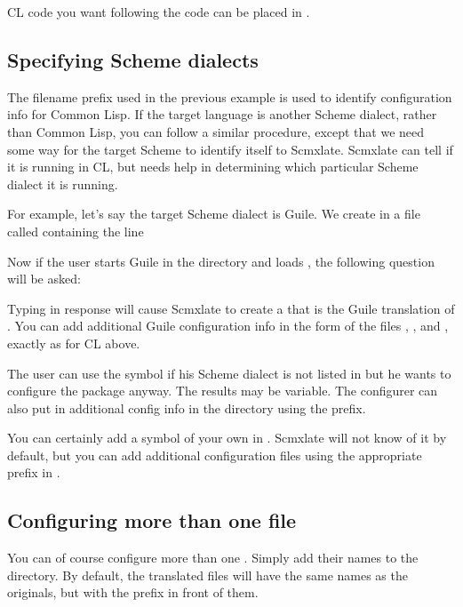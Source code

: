 CL code you want following the  code can be
placed in .

\subsection{Specifying Scheme dialects}

The filename prefix  used in the previous
example is used to identify configuration info
for Common Lisp.  If the target language is another
Scheme dialect, rather than Common Lisp, you can follow
a similar procedure, except that we need some way for
the target Scheme to identify itself to Scmxlate.
Scmxlate can tell if it is running in CL, but
needs help in determining which particular Scheme
dialect it is running.

For example, let's say the target Scheme dialect
is Guile.  We create in  a file called
 containing the line


Now if the user starts Guile in the 
directory and loads , the following
question will be asked:


Typing  in response will cause Scmxlate to
create a  that is the Guile translation
of .  You can add additional Guile
configuration info in the form of the files
, ,
and , exactly as for CL
above.

The user can use the symbol  if his Scheme
dialect is not listed in  but
he wants to configure the package anyway.  The results
may be variable.  The configurer can also put in
additional config info in the 
directory using the  prefix.

You can certainly add a symbol of your own in
.  Scmxlate will not know
of it by default, but you can add additional
configuration files using the appropriate prefix in
.

\subsection{Configuring more than one file}

You can of course configure more than one .
Simply add their names to the
 directory.  By
default, the translated files will have the same names
as the originals, but with the prefix  in front
of them.

